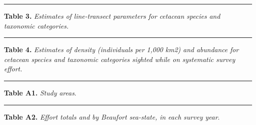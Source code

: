 \documentclass[
]{book}
\newenvironment{Shaded}{\begin{snugshade}}{\end{snugshade}}
\newcommand{\NormalTok}[1]{#1}
\newcommand{\SpecialCharTok}[1]{\textcolor[rgb]{0.00,0.00,0.00}{#1}}
\begin{document}
\begin{Shaded}
\end{Shaded}

\begin{center}\rule{0.5\linewidth}{0.5pt}\end{center}

\textbf{Table 3.} \emph{Estimates of line-transect parameters for cetacean species and taxonomic categories.}

\begin{Shaded}
\end{Shaded}

\begin{center}\rule{0.5\linewidth}{0.5pt}\end{center}

\textbf{Table 4.} \emph{Estimates of density (individuals per 1,000 km2) and abundance for cetacean species and taxonomic categories sighted while on systematic survey effort.}

\begin{Shaded}
\end{Shaded}

\begin{center}\rule{0.5\linewidth}{0.5pt}\end{center}

\textbf{Table A1.} \emph{Study areas}.

\begin{Shaded}
\end{Shaded}

\begin{center}\rule{0.5\linewidth}{0.5pt}\end{center}

\textbf{Table A2.} \emph{Effort totals and by Beaufort sea-state, in each survey year}.
\end{document}
